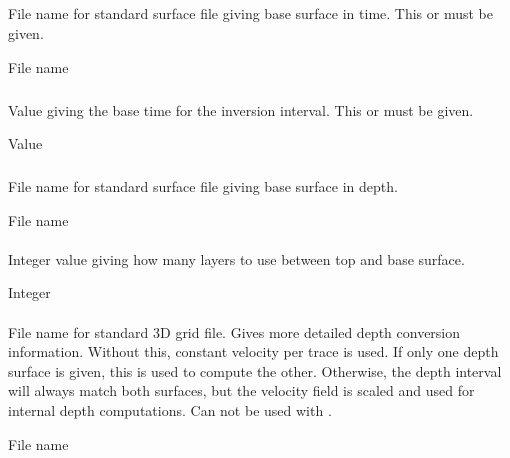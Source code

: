 \subparagraph{} 
\slist
   \item \Description File name for standard surface file giving base surface in time. This or  must be given.
   \item \Argument File name
   \item \Default
\elist

\subparagraph{} 
\slist
   \item \Description Value giving the base time for the inversion interval. This or  must be given.
   \item \Argument Value
   \item \Default
\elist

\subparagraph{} 
\slist
   \item \Description File name for standard surface file giving base surface in depth.
   \item \Argument File name
   \item \Default
\elist


\paragraph{} 
 \slist
   \item \Description Integer value giving how many layers to use between top and base surface.
   \item \Argument Integer
   \item \Default
 \elist

\paragraph{} 
 \slist
   \item \Description File name for standard 3D grid file. Gives more detailed depth conversion information. Without this, constant velocity per trace is used. If only one depth surface is given, this is used to compute the other. Otherwise, the depth interval will always match both surfaces, but the velocity field is scaled and used for internal depth computations. Can not be used with .
   \item \Argument File name
   \item \Default
 \elist

